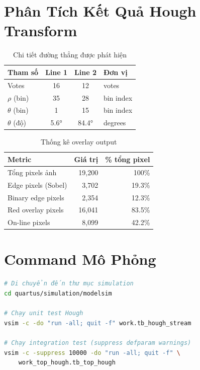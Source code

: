 \documentclass[12pt,a4paper]{report}
\begin{document}
\section{Phân Tích Kết Quả Hough Transform}

\begin{table}[H]
\centering
\caption{Chi tiết đường thẳng được phát hiện}
\begin{tabular}{|l|c|c|l|}
\hline
\textbf{Tham số} & \textbf{Line 1} & \textbf{Line 2} & \textbf{Đơn vị} \\
\hline
Votes & 16 & 12 & votes \\
$\rho$ (bin) & 35 & 28 & bin index \\
$\theta$ (bin) & 1 & 15 & bin index \\
$\theta$ (độ) & 5.6° & 84.4° & degrees \\
\hline
\end{tabular}
\end{table}

\begin{table}[H]
\centering
\caption{Thống kê overlay output}
\begin{tabular}{|l|r|r|}
\hline
\textbf{Metric} & \textbf{Giá trị} & \textbf{\% tổng pixel} \\
\hline
Tổng pixels ảnh & 19,200 & 100\% \\
Edge pixels (Sobel) & 3,702 & 19.3\% \\
Binary edge pixels & 2,354 & 12.3\% \\
Red overlay pixels & 16,041 & 83.5\% \\
On-line pixels & 8,099 & 42.2\% \\
\hline
\end{tabular}
\end{table}

\section{Command Mô Phỏng}

\begin{lstlisting}[language=bash, caption={Commands chạy mô phỏng}]
# Di chuyển đến thư mục simulation
cd quartus/simulation/modelsim

# Chạy unit test Hough
vsim -c -do "run -all; quit -f" work.tb_hough_stream

# Chạy integration test (suppress defparam warnings)
vsim -c -suppress 10000 -do "run -all; quit -f" \
    work_top_hough.tb_top_hough
\end{lstlisting}
\end{document}
